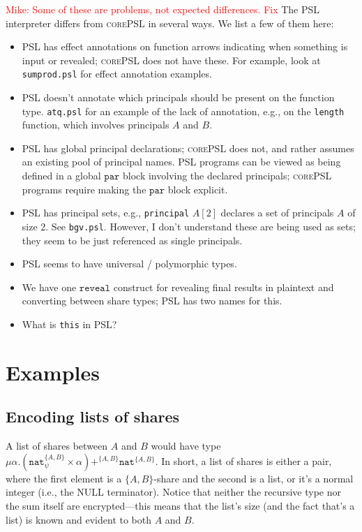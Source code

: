 \documentclass[10pt]{article}
\newcommand{\kw}[1]{\ensuremath{\mathtt{#1}}}
\newcommand{\tnat}{\ensuremath{\mathtt{nat}}}
\newcommand{\tpair}[2]{\ensuremath{{#1} \times {#2}}}
\newcommand{\tsum}[3]{\ensuremath{{#1} +^{#3} {#2}}}
\newcommand{\trec}[2]{\ensuremath{\mu {#1}.{#2}}}
\newcommand{\lang}{\textsc{corePSL}\xspace}
\newcommand{\mwh}[1]{\textcolor{red}{Mike: #1}}
\begin{document}
\mwh{Some of these are problems, not expected differences. Fix}
The PSL interpreter differs from \lang in several ways. We list a few
of them here:
\begin{itemize}
\item PSL has effect annotations on function arrows indicating when
  something is input or revealed; \lang does not have these. For
  example, look at \texttt{sumprod.psl} for effect annotation
  examples.
\item PSL doesn't annotate which principals should be present on the
  function type. \texttt{atq.psl} for an example of the lack
  of annotation, e.g., on the \texttt{length} function, which involves
  principals $A$ and $B$. 
\item PSL has global principal declarations; \lang does not, and
  rather assumes an existing pool of principal names. PSL programs can
  be viewed as being defined in a global $\kw{par}$ block involving
  the declared principals; \lang programs require making the
  $\kw{par}$ block explicit.
\item PSL has principal sets, e.g., \texttt{principal} $A[2]$ declares
  a set of principals $A$ of size 2. See \texttt{bgv.psl}. However, I
  don't understand these are being used as sets; they seem to be just
  referenced as single principals.
\item PSL seems to have universal / polymorphic types.
\item We have one $\kw{reveal}$ construct for revealing final results
  in plaintext and converting between share types; PSL has two names
  for this.
\item What is \texttt{this} in PSL?
\end{itemize}

\section{Examples}
\label{sec:examples}

\subsection{Encoding lists of shares}

\newcommand{\twoprins}{\ensuremath{\{A,B\}}}

A list of shares between $A$ and $B$ would have type
$\trec{\alpha}{\tsum{(\tpair{\tnat^{\twoprins}_\psi}{\alpha})}{\tnat^{\twoprins}}{\twoprins}}$. In
short, a list of shares is either a pair, where the first element is a
\twoprins-share and the second is a list, or it's a normal integer
(i.e., the NULL terminator). Notice that neither the recursive type
nor the sum itself are encrypted---this means that the list's size
(and the fact that's a list) is known and evident to both $A$ and $B$.
\end{document}
